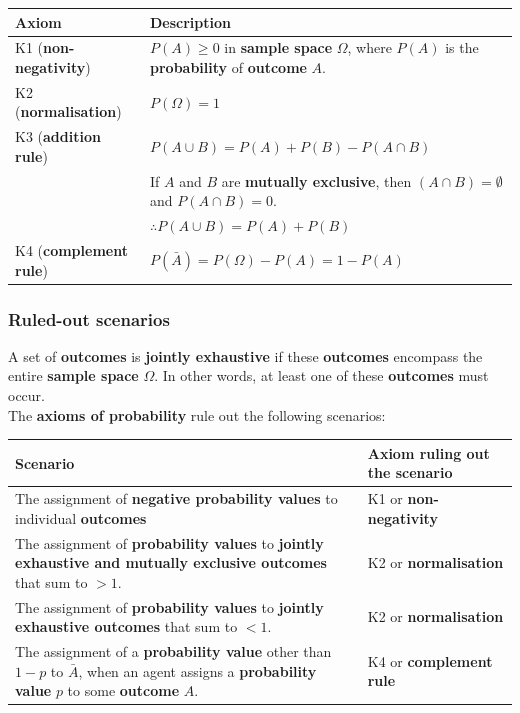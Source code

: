 \documentclass[11pt]{article}
\begin{document}
\begin{center}
\begin{tabularx}{\textwidth}{|X|X|}
\hline
Axiom & Description\\
\hline
K1 (\textbf{non-negativity}) & \(P(A) \ge 0\) in \textbf{sample space} \(\Omega\), where \(P(A)\) is the \textbf{probability} of \textbf{outcome} \(A\).\\
\hline
K2 (\textbf{normalisation}) & \(P(\Omega) = 1\)\\
\hline
K3 (\textbf{addition rule}) & \(P (A \cup B) = P(A) + P(B) - P(A \cap B)\)\\
 & If \(A\) and \(B\) are \textbf{mutually exclusive}, then \((A \cap B) = \emptyset\) and \(P(A \cap B) = 0\).\\
 & \(\therefore P(A \cup B) = P(A) + P(B)\)\\
\hline
K4 (\textbf{complement rule}) & \(P(\bar{A}) = P(\Omega) - P(A) = 1 - P(A)\)\\
\hline
\end{tabularx}
\end{center}
\subsubsection{Ruled-out scenarios}
\label{sec:org8b2e2d7}
A set of \textbf{outcomes} is \textbf{jointly exhaustive} if these \textbf{outcomes} encompass the entire \textbf{sample space} \(\Omega\). In other words, at least one of these \textbf{outcomes} must occur.  \\

The \textbf{axioms of probability} rule out the following scenarios:
\begin{center}
\begin{tabularx}{\textwidth}{|X|X|}
\hline
Scenario & Axiom ruling out the scenario\\
\hline
The assignment of \textbf{negative probability values} to individual \textbf{outcomes} & K1 or \textbf{non-negativity}\\
\hline
The assignment of \textbf{probability values} to \textbf{jointly exhaustive and mutually exclusive outcomes} that sum to \(> 1\). & K2 or \textbf{normalisation}\\
\hline
The assignment of \textbf{probability values} to \textbf{jointly exhaustive outcomes} that sum to \(< 1\). & K2 or \textbf{normalisation}\\
\hline
The assignment of a \textbf{probability value} other than \(1 - p\) to \(\bar{A}\), when an agent assigns a \textbf{probability value} \(p\) to some \textbf{outcome} \(A\). & K4 or \textbf{complement rule}\\
\hline
\end{tabularx}
\end{center}
\end{document}
